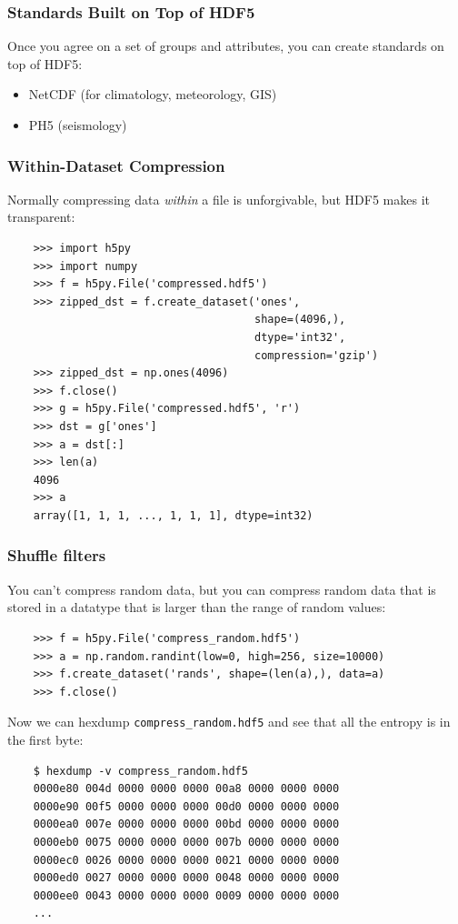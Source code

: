 \documentclass[9pt]{beamer}
\begin{document}
\begin{frame}[fragile]
  \frametitle{Standards Built on Top of HDF5}
  Once you agree on a set of groups and attributes, you can create standards on top of HDF5:
  \begin{itemize}
  \item NetCDF (for climatology, meteorology, GIS)
  \item PH5 (seismology)
  \end{itemize}
\end{frame}

\begin{frame}[fragile]
  \frametitle{Within-Dataset Compression}
  Normally compressing data \emph{within} a file is unforgivable, but HDF5 makes it transparent:
  \begin{verbatim}
    >>> import h5py
    >>> import numpy
    >>> f = h5py.File('compressed.hdf5')
    >>> zipped_dst = f.create_dataset('ones',
                                      shape=(4096,), 
                                      dtype='int32',
                                      compression='gzip')
    >>> zipped_dst = np.ones(4096)
    >>> f.close()
    >>> g = h5py.File('compressed.hdf5', 'r')
    >>> dst = g['ones']
    >>> a = dst[:]
    >>> len(a)
    4096
    >>> a
    array([1, 1, 1, ..., 1, 1, 1], dtype=int32)
  \end{verbatim}
\end{frame}

\begin{frame}[fragile]
  \frametitle{Shuffle filters}
  You can't compress random data, but you can compress random data that is stored in a datatype that is larger than the range of random values:
  \begin{verbatim}
    >>> f = h5py.File('compress_random.hdf5')
    >>> a = np.random.randint(low=0, high=256, size=10000)
    >>> f.create_dataset('rands', shape=(len(a),), data=a)
    >>> f.close()
  \end{verbatim}
  Now we can hexdump \texttt{compress\_random.hdf5} and see that all the entropy is in the first byte:
  \begin{verbatim}
    $ hexdump -v compress_random.hdf5
    0000e80 004d 0000 0000 0000 00a8 0000 0000 0000
    0000e90 00f5 0000 0000 0000 00d0 0000 0000 0000
    0000ea0 007e 0000 0000 0000 00bd 0000 0000 0000
    0000eb0 0075 0000 0000 0000 007b 0000 0000 0000
    0000ec0 0026 0000 0000 0000 0021 0000 0000 0000
    0000ed0 0027 0000 0000 0000 0048 0000 0000 0000
    0000ee0 0043 0000 0000 0000 0009 0000 0000 0000
    ...
  \end{verbatim}
\end{frame}
\end{document}

